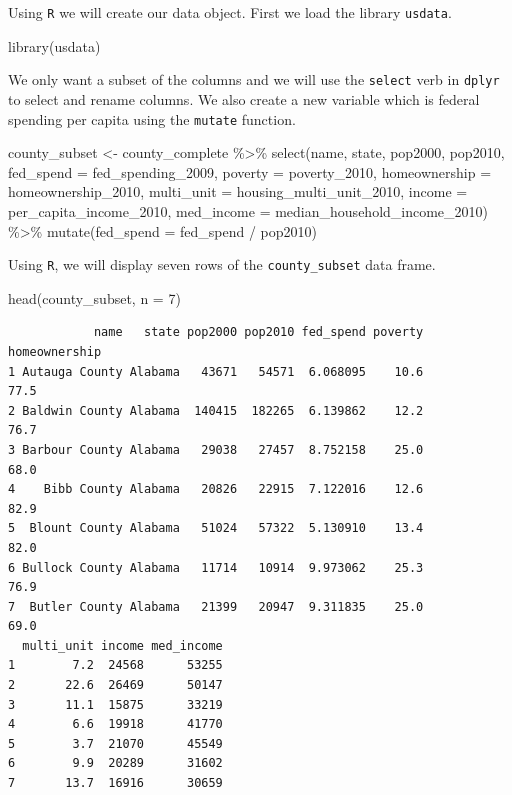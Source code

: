 \documentclass[
  letterpaper,
  DIV=11,
  numbers=noendperiod]{scrreprt}
\newenvironment{Shaded}{\begin{snugshade}}{\end{snugshade}}
\newcommand{\AttributeTok}[1]{\textcolor[rgb]{0.40,0.45,0.13}{#1}}
\newcommand{\DecValTok}[1]{\textcolor[rgb]{0.68,0.00,0.00}{#1}}
\newcommand{\FunctionTok}[1]{\textcolor[rgb]{0.28,0.35,0.67}{#1}}
\newcommand{\NormalTok}[1]{\textcolor[rgb]{0.00,0.23,0.31}{#1}}
\newcommand{\OtherTok}[1]{\textcolor[rgb]{0.00,0.23,0.31}{#1}}
\newcommand{\SpecialCharTok}[1]{\textcolor[rgb]{0.37,0.37,0.37}{#1}}
\begin{document}
Using \texttt{R} we will create our data object. First we load the
library \texttt{usdata}.

\begin{Shaded}
\begin{Highlighting}[]
\FunctionTok{library}\NormalTok{(usdata)}
\end{Highlighting}
\end{Shaded}

We only want a subset of the columns and we will use the \texttt{select}
verb in \texttt{dplyr} to select and rename columns. We also create a
new variable which is federal spending per capita using the
\texttt{mutate} function.

\begin{Shaded}
\begin{Highlighting}[]
\NormalTok{county\_subset }\OtherTok{\textless{}{-}}\NormalTok{ county\_complete }\SpecialCharTok{\%\textgreater{}\%} 
  \FunctionTok{select}\NormalTok{(name, state, pop2000, pop2010, }\AttributeTok{fed\_spend =}\NormalTok{ fed\_spending\_2009, }
         \AttributeTok{poverty =}\NormalTok{ poverty\_2010, }\AttributeTok{homeownership =}\NormalTok{ homeownership\_2010, }
         \AttributeTok{multi\_unit =}\NormalTok{ housing\_multi\_unit\_2010, }\AttributeTok{income =}\NormalTok{ per\_capita\_income\_2010, }
         \AttributeTok{med\_income =}\NormalTok{ median\_household\_income\_2010) }\SpecialCharTok{\%\textgreater{}\%}
  \FunctionTok{mutate}\NormalTok{(}\AttributeTok{fed\_spend =}\NormalTok{ fed\_spend }\SpecialCharTok{/}\NormalTok{ pop2010)}
\end{Highlighting}
\end{Shaded}

Using \texttt{R}, we will display seven rows of the
\texttt{county\_subset} data frame.

\begin{Shaded}
\begin{Highlighting}[]
\FunctionTok{head}\NormalTok{(county\_subset, }\AttributeTok{n =} \DecValTok{7}\NormalTok{)}
\end{Highlighting}
\end{Shaded}

\begin{verbatim}
            name   state pop2000 pop2010 fed_spend poverty homeownership
1 Autauga County Alabama   43671   54571  6.068095    10.6          77.5
2 Baldwin County Alabama  140415  182265  6.139862    12.2          76.7
3 Barbour County Alabama   29038   27457  8.752158    25.0          68.0
4    Bibb County Alabama   20826   22915  7.122016    12.6          82.9
5  Blount County Alabama   51024   57322  5.130910    13.4          82.0
6 Bullock County Alabama   11714   10914  9.973062    25.3          76.9
7  Butler County Alabama   21399   20947  9.311835    25.0          69.0
  multi_unit income med_income
1        7.2  24568      53255
2       22.6  26469      50147
3       11.1  15875      33219
4        6.6  19918      41770
5        3.7  21070      45549
6        9.9  20289      31602
7       13.7  16916      30659
\end{verbatim}
\end{document}
